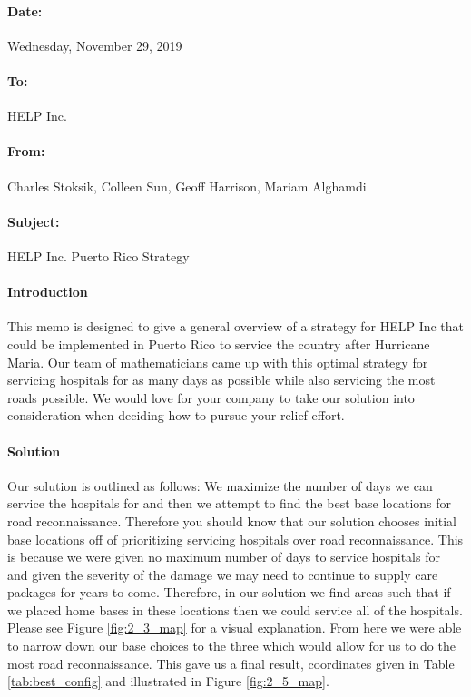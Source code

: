 \paragraph{Date:} Wednesday, November 29, 2019
\paragraph{To:} HELP Inc.
\paragraph{From:} Charles Stoksik, Colleen Sun, Geoff Harrison, Mariam Alghamdi
\paragraph{Subject:} HELP Inc. Puerto Rico Strategy
\paragraph{Introduction} This memo is designed to give a general overview of a strategy for HELP Inc that could be implemented in Puerto Rico to service the country after Hurricane Maria. Our team of mathematicians came up with this optimal strategy for servicing hospitals for as many days as possible while also servicing the most roads possible. We would love for your company to take our solution into consideration when deciding how to pursue your relief effort.
\paragraph{Solution} Our solution is outlined as follows: We maximize the number of days we can service the hospitals for and then we attempt to find the best base locations for road reconnaissance. Therefore you should know that our solution chooses initial base locations off of prioritizing servicing hospitals over road reconnaissance. This is because we were given no maximum number of days to service hospitals for and given the severity of the damage we may need to continue to supply care packages for years to come. Therefore, in our solution we find areas such that if we placed home bases in these locations then we could service all of the hospitals. Please see Figure \ref{fig:2_3_map} for a visual explanation. From here we were able to narrow down our base choices to the three which would allow for us to do the most road reconnaissance. This gave us a final result, coordinates given in Table \ref{tab:best_config} and illustrated in Figure \ref{fig:2_5_map}.
